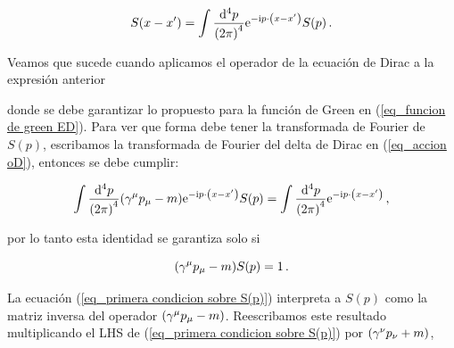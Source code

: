 \begin{equation}
	S(x-x^\prime) = \int \frac{\dd[4]{ p }}{\qty(2\pi) ^4 } \mathrm{e}^{- \mathrm{i} p \cdot \qty( x - x^\prime ) } S(p) \, .
	\label{eq_Transformada de Fourier de S(x-xl)}
\end{equation} 

Veamos que sucede cuando aplicamos el operador de la ecuación de Dirac a la expresión anterior


donde se debe garantizar lo propuesto para la función de Green en (\ref{eq_funcion de green ED}). Para ver que forma debe tener la transformada de Fourier de $S(p)$, escribamos la transformada de Fourier del delta de Dirac en (\ref{eq_accion oD}), entonces se debe cumplir:

\begin{equation}
	\int \frac{\dd[4]{ p }}{\qty(2\pi) ^4 } \qty( \gamma^\mu  p_\mu - m )  \mathrm{e}^{- \mathrm{i} p \cdot \qty( x - x^\prime ) } S(p) = \int \frac{\dd[4]{ p }}{\qty(2\pi) ^4 } \mathrm{e}^{- \mathrm{i} p \cdot \qty( x - x^\prime ) } \, ,
\end{equation}

por lo tanto esta identidad se garantiza solo si

\begin{equation}
	\qty( \gamma^\mu  p_\mu - m )   S(p) = 1 \, .
	\label{eq_primera condicion sobre S(p)}
\end{equation}

La ecuación (\ref{eq_primera condicion sobre S(p)}) interpreta a $S(p)$ como la matriz inversa del operador $\qty( \gamma^\mu  p_\mu - m ) $.  Reescribamos este resultado multiplicando el LHS de (\ref{eq_primera condicion sobre S(p)}) por $\qty( \gamma^\nu p_\nu + m )$, 

